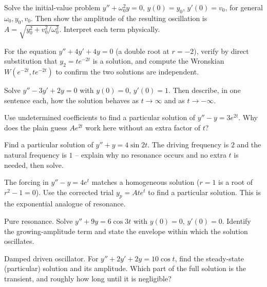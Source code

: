 \begin{exercise}
\label{ch38:ex-2}
Solve the initial-value problem $y'' + \omega_0^2 y = 0$, $y(0) = y_0$, $y'(0) =
v_0$, for general $\omega_0, y_0, v_0$. Then show the amplitude of the resulting
oscillation is $A = \sqrt{y_0^2 + v_0^2/\omega_0^2}$. Interpret each term
physically.
\end{exercise}

\begin{exercise}
\label{ch38:ex-3}
For the equation $y'' + 4y' + 4y = 0$ (a double root at $r = -2$), verify by
direct substitution that $y_2 = t e^{-2t}$ is a solution, and compute the
Wronskian $W(e^{-2t}, t e^{-2t})$ to confirm the two solutions are independent.
\end{exercise}

\begin{exercise}
\label{ch38:ex-4}
Solve $y'' - 3y' + 2y = 0$ with $y(0) = 0$, $y'(0) = 1$. Then describe, in one
sentence each, how the solution behaves as $t \to \infty$ and as $t \to -\infty$.
\end{exercise}

\begin{exercise}
\label{ch38:ex-5}
Use undetermined coefficients to find a particular solution of $y'' - y = 3e^{2t}$.
Why does the plain guess $A e^{2t}$ work here without an extra factor of $t$?
\end{exercise}

\begin{exercise}
\label{ch38:ex-6}
Find a particular solution of $y'' + y = 4\sin 2t$. The driving frequency is $2$
and the natural frequency is $1$ -- explain why no resonance occurs and no extra
$t$ is needed, then solve.
\end{exercise}

\begin{exercise}
\label{ch38:ex-7}
The forcing in $y'' - y = 4e^{t}$ matches a homogeneous solution ($r = 1$ is a
root of $r^2 - 1 = 0$). Use the corrected trial $y_p = A t e^{t}$ to find a
particular solution. This is the exponential analogue of resonance.
\end{exercise}

\begin{exercise}
\label{ch38:ex-8}
Pure resonance. Solve $y'' + 9y = 6\cos 3t$ with $y(0) = 0$, $y'(0) = 0$. Identify
the growing-amplitude term and state the envelope within which the solution
oscillates.
\end{exercise}

\begin{exercise}
\label{ch38:ex-9}
Damped driven oscillator. For $y'' + 2y' + 2y = 10\cos t$, find the steady-state
(particular) solution and its amplitude. Which part of the full solution is the
transient, and roughly how long until it is negligible?
\end{exercise}

